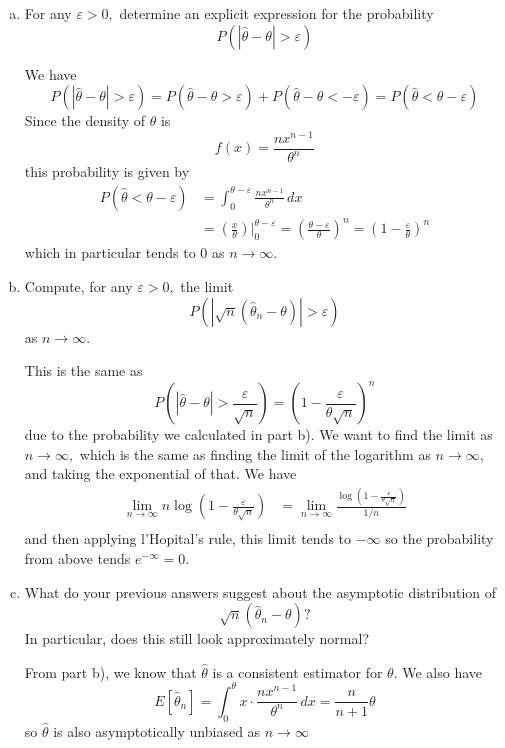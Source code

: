 \documentclass{article}
\begin{document}
\begin{enumerate}
\begin{enumerate}[a)]
\begin{proof}
				\end{proof}

			\item For any $\varepsilon>0,$ determine an explicit expression for the probability \[P\left( |\hat{\theta}-\theta| > \varepsilon \right)\]
				\begin{soln}
					We have \[P(|\hat{\theta}-\theta|>\varepsilon) = P(\hat{\theta}-\theta>\varepsilon)+P(\hat{\theta}-\theta<-\varepsilon)=P(\hat{\theta}<\theta-\varepsilon)\] Since the density of $\hat{\theta}$ is \[f(x)=\frac{nx^{n-1}}{\theta^n}\] this probability is given by
					\begin{align*}
						P(\hat{\theta}<\theta-\varepsilon) &= \int_0^{\theta-\varepsilon} \frac{n x^{n-1}}{\theta^n}\, dx \\
						&= \left( \frac{x}{\theta} \right)\bigg\vert^{\theta-\varepsilon}_0 = \left( \frac{\theta-\varepsilon}{\theta} \right)^n = \left( 1-\frac{\varepsilon}{\theta} \right)^n
					\end{align*} which in particular tends to 0 as $n\to\infty.$

				\end{soln}

			\item Compute, for any $\varepsilon>0,$ the limit \[P\left( |\sqrt{n}(\hat{\theta}_n-\theta)| > \varepsilon \right) \] as $n\to\infty.$
				\begin{soln}
					This is the same as \[P\left( |\hat{\theta}-\theta| > \frac{\varepsilon}{\sqrt{n}} \right)=\left( 1-\frac{\varepsilon}{\theta\sqrt{n}} \right)^n\] due to the probability we calculated in part b). We want to find the limit as $n\to\infty,$ which is the same as finding the limit of the logarithm as $n\to\infty,$ and taking the exponential of that. We have 
					\begin{align*}
						\lim_{n\to\infty} n\log\left( 1-\frac{\varepsilon}{\theta\sqrt{n}} \right) &= \lim_{n\to\infty} \frac{\log\left( 1-\frac{\varepsilon}{\theta\sqrt{n}} \right)}{1/n} \\
					\end{align*} and then applying l'Hopital's rule, this limit tends to $-\infty$ so the probability from above tends $e^{-\infty}=0.$
					
				\end{soln}

			\item What do your previous answers suggest about the asymptotic distribution of \[\sqrt{n}(\hat{\theta}_n-\theta)?\] In particular, does this still look approximately normal?
				\begin{soln}
					From part b), we know that $\hat{\theta}$ is a consistent estimator for $\theta.$ We also have \[E[\hat{\theta}_n]=\int_0^\theta x\cdot\frac{nx^{n-1}}{\theta^n}\, dx=\frac{n}{n+1}\theta\] so $\hat{\theta}$ is also asymptotically unbiased as $n\to\infty$


\end{soln}
\end{enumerate}
\end{enumerate}
\end{document}
